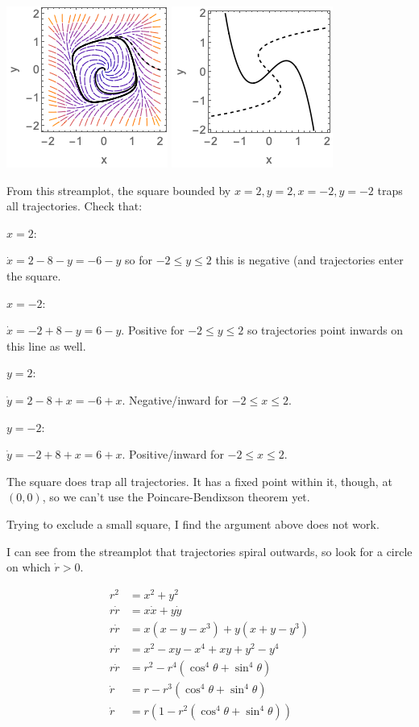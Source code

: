 \documentclass[12pt,letterpaper,noanswers]{exam}
\begin{document}
\begin{questions}
\begin{parts}
\begin{solution}
\includegraphics{img/PS06-1c.png}
\includegraphics{img/PS06-1c2.png}

From this streamplot, the square bounded by $x = 2, y = 2, x = -2, y = -2$ traps all trajectories.  Check that:

$x = 2$:

$\dot x = 2-8-y = -6-y$ so for $-2\leq y \leq 2$ this is negative (and trajectories enter the square.

$x = -2$:

$\dot x = -2+8-y = 6-y$.  Positive for $-2\leq y \leq 2$ so trajectories point inwards on this line as well.

$y = 2$:

$\dot y = 2 - 8 + x = -6 + x$.  Negative/inward for $-2\leq x \leq 2$.

$y = -2$:

$\dot y = -2 + 8 + x = 6 + x$.  Positive/inward for $-2\leq x \leq 2$.

The square does trap all trajectories.  It has a fixed point within it, though, at $(0,0)$, so we can't use the Poincare-Bendixson theorem yet.

Trying to exclude a small square, I find the argument above does not work. 

I can see from the streamplot that trajectories spiral outwards, so look for a circle on which $\dot r > 0$.

\begin{align*}
r^2 &= x^2 + y^2 \\
r\dot r &= x\dot x + y\dot y \\
r\dot r &= x(x-y-x^3) + y(x+y-y^3) \\
r\dot r &= x^2 - xy - x^4 +xy + y^2 - y^4 \\
r\dot r &= r^2 - r^4(\cos^4 \theta + \sin^4\theta) \\
\dot r &= r - r^3(\cos^4 \theta + \sin^4\theta) \\
\dot r &= r(1 - r^2(\cos^4 \theta + \sin^4\theta))
\end{align*}


\end{solution}
\end{parts}
\end{questions}
\end{document}
